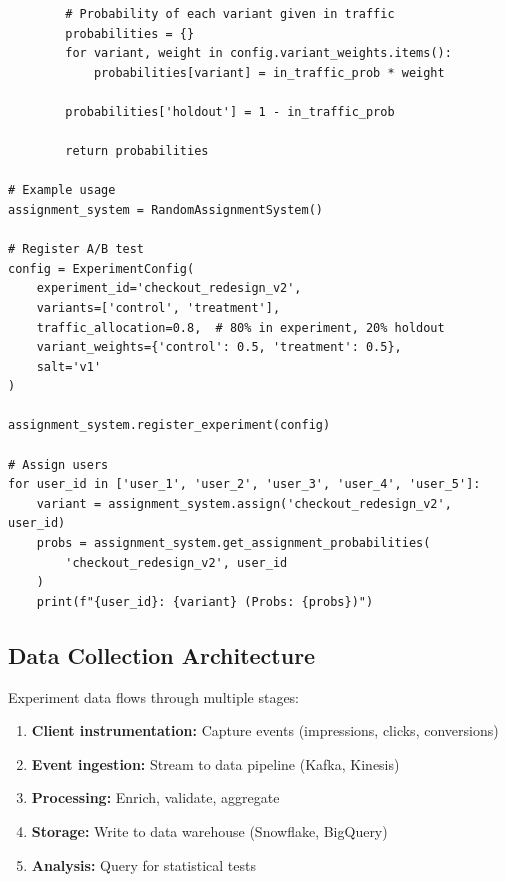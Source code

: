 \begin{lstlisting}
        # Probability of each variant given in traffic
        probabilities = {}
        for variant, weight in config.variant_weights.items():
            probabilities[variant] = in_traffic_prob * weight

        probabilities['holdout'] = 1 - in_traffic_prob

        return probabilities

# Example usage
assignment_system = RandomAssignmentSystem()

# Register A/B test
config = ExperimentConfig(
    experiment_id='checkout_redesign_v2',
    variants=['control', 'treatment'],
    traffic_allocation=0.8,  # 80% in experiment, 20% holdout
    variant_weights={'control': 0.5, 'treatment': 0.5},
    salt='v1'
)

assignment_system.register_experiment(config)

# Assign users
for user_id in ['user_1', 'user_2', 'user_3', 'user_4', 'user_5']:
    variant = assignment_system.assign('checkout_redesign_v2', user_id)
    probs = assignment_system.get_assignment_probabilities(
        'checkout_redesign_v2', user_id
    )
    print(f"{user_id}: {variant} (Probs: {probs})")
\end{lstlisting}

\subsection{Data Collection Architecture}

Experiment data flows through multiple stages:

\begin{enumerate}
    \item \textbf{Client instrumentation:} Capture events (impressions, clicks, conversions)
    \item \textbf{Event ingestion:} Stream to data pipeline (Kafka, Kinesis)
    \item \textbf{Processing:} Enrich, validate, aggregate
    \item \textbf{Storage:} Write to data warehouse (Snowflake, BigQuery)
    \item \textbf{Analysis:} Query for statistical tests
\end{enumerate}

